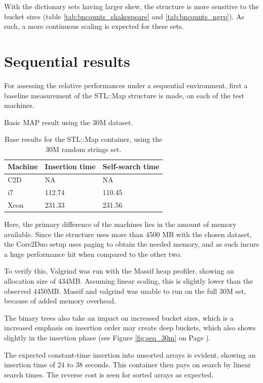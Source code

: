 With the dictionary sets having larger skew, the structure is more sensitive to
the bucket sizes (table \ref{tab:bncounts_shakespeare} and
\ref{tab:bncounts_ngrp}). As such, a more continuous scaling is expected for
these sets.

\section{Sequential results}
For assessing the relative performances under a sequential environment, first a
baseline measurement of the {\keyword STL::Map} structure is made, on each of
the test machines.

Basic MAP result using the 30M dataset.
\begin{table}[h!]
    \centering
    \begin{tabular}[here]{ l l l }
        \hline
        Machine   & Insertion time & Self-search time  \\\hline
        C2D       & NA             & NA                \\\hline
        i7        & 112.74         & 110.45            \\\hline
        Xeon      & 231.33         & 231.56            \\\hline 
    \end{tabular}
    \caption{Base results for the STL::Map container, using the 30M random strings set.}
    \label{tab:maptimes}
\end{table}

Here, the primary difference of the machines lies in the amount of memory
available. Since the structure uses more than 4500 MB with the chosen dataset,
the Core2Duo setup uses paging to obtain the needed memory, and as such incurs
a huge performance hit when compared to the other two.

To verify this, Valgrind was run with the Massif heap profiler, showing an
allocation size of 434MB. Assuming linear scaling, this is slightly lower than
the observed 4450MB. Massif and valgrind was unable to run on the full 30M set,
because of added memory overhead.

The binary trees also take an impact on increased bucket sizes, which
is a increased emphasis on insertion order may create deep buckets, which also
shows slightly in the insertion phase (see Figure \ref{fig:seq_30m} on
Page \pageref{fig:seq_30m}).

The expected constant-time insertion into unsorted arrays is evident, showing
an insertion time of $24$ to $38$ seconds. This container then pays on search
by linear search times. The reverse cost is seen for sorted arrays as expected.

